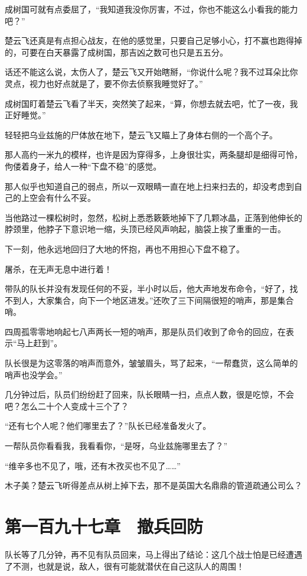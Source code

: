 成树国可就有点委屈了，“我知道我没你厉害，不过，你也不能这么小看我的能力吧？”

楚云飞还真是有点担心战友，在他的感觉里，只要自己足够小心，打不赢也跑得掉的，可要在白天暴露了成树国，那吉凶之数可也只是五五分。

话还不能这么说，太伤人了，楚云飞又开始瞎掰，“你说什么呢？我不过耳朵比你灵点，视力也好点就是了，要不你去侦察我睡觉好了。”

成树国盯着楚云飞看了半天，突然笑了起来，“算，你想去就去吧，忙了一夜，我正好睡觉。”

轻轻把乌业兹施的尸体放在地下，楚云飞又瞄上了身体右侧的一个高个子。

那人高约一米九的模样，也许是因为穿得多，上身很壮实，两条腿却是细得可怜，佝偻着身子，给人一种“下盘不稳”的感觉。

那人似乎也知道自己的弱点，所以一双眼睛一直在地上扫来扫去的，却没考虑到自己的上空会有什么不妥。

当他路过一棵松树时，忽然，松树上悉悉簌簌地掉下了几颗冰晶，正落到他伸长的脖颈里，他脖子下意识地一缩，头顶已经风声响起，脑袋上挨了重重的一击。

下一刻，他永远地回归了大地的怀抱，再也不用担心下盘不稳了。

屠杀，在无声无息中进行着！

带队的队长并没有发现任何的不妥，半小时以后，他大声地发布命令，“好了，找不到人，大家集合，向下一个地区进发。”还吹了三下间隔很短的哨声，那是集合哨。

四周孤零零地响起七八声两长一短的哨声，那是队员们收到了命令的回应，在表示“马上赶到”。

队长很是为这零落的哨声而意外，皱皱眉头，骂了起来，“一帮蠢货，这么简单的哨声也没学会。”

几分钟过后，队员们纷纷赶了回来，队长眼睛一扫，点点人数，很是吃惊，不会吧？怎么二十个人变成十三个了？

“还有七个人呢？他们哪里去了？”队长已经准备发火了。

一帮队员你看看我，我看看你，“是呀，乌业兹施哪里去了？”

“维辛多也不见了，哦，还有木孜买也不见了……”

木子美？楚云飞听得差点从树上掉下去，那不是英国大名鼎鼎的管道疏通公司么？

\section{第一百九十七章　撤兵回防}

队长等了几分钟，再不见有队员回来，马上得出了结论：这几个战士怕是已经遭遇了不测，也就是说，敌人，很有可能就潜伏在自己这队人的周围！

